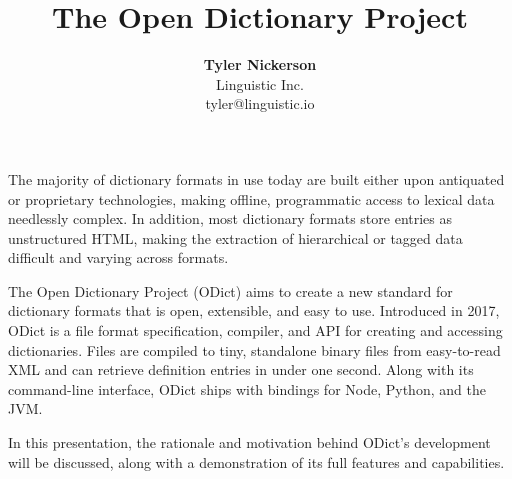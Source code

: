 \documentclass{article}
\begin{document}
\title{\textbf{The Open Dictionary Project}}
\author{\textbf{Tyler Nickerson} \\ \small{Linguistic Inc.} \\ \small{tyler@linguistic.io}}
\date{}
\maketitle
The majority of dictionary formats in use today are built either upon antiquated or proprietary technologies, making offline, programmatic access to lexical data needlessly complex.
In addition, most dictionary formats store entries as unstructured HTML, making the extraction of hierarchical or tagged data difficult and varying across formats.

The Open Dictionary Project (ODict) aims to create a new standard for dictionary formats that is open, extensible, and easy to use. Introduced in 2017, ODict is a file format specification, compiler, and API for creating and accessing dictionaries.
Files are compiled to tiny, standalone binary files from easy-to-read XML and can retrieve definition entries in under one second. Along with its command-line interface, ODict ships with bindings for Node, Python, and the JVM.

In this presentation, the rationale and motivation behind ODict's development will be discussed, along with a demonstration of its full features and capabilities.
\end{document}
